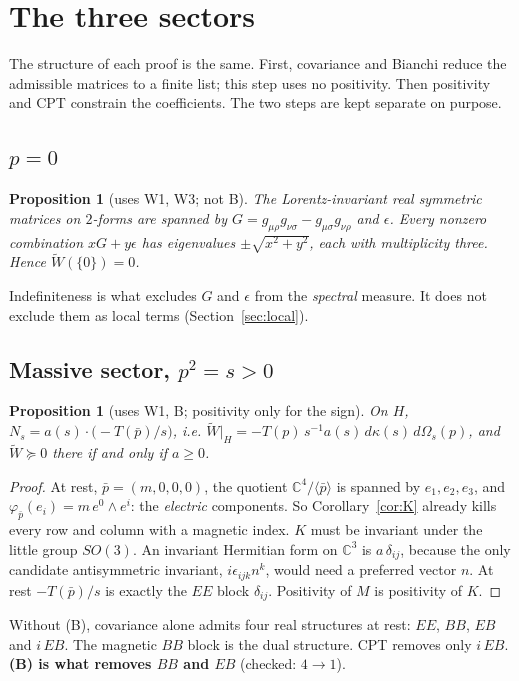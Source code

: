 \documentclass[11pt]{article}
\newtheorem{proposition}[theorem]{Proposition}
\theoremstyle{remark}
\newcommand{\Wt}{\widetilde W}
\newcommand{\Tt}{T}
\begin{document}
\section{The three sectors}

The structure of each proof is the same. First, covariance and Bianchi reduce
the admissible matrices to a finite list; this step uses no positivity. Then
positivity and CPT constrain the coefficients. The two steps are kept
separate on purpose.

\subsection{$p=0$}

\begin{proposition}[uses W1, W3; not B]\label{prop:zero}
The Lorentz-invariant real symmetric matrices on $2$-forms are spanned by
$G=g_{\mu\rho}g_{\nu\sigma}-g_{\mu\sigma}g_{\nu\rho}$ and $\epsilon$. Every
nonzero combination $xG+y\epsilon$ has eigenvalues $\pm\sqrt{x^2+y^2}$, each
with multiplicity three. Hence $\Wt(\{0\})=0$.
\end{proposition}
Indefiniteness is what excludes $G$ and $\epsilon$ from the \emph{spectral}
measure. It does not exclude them as local terms (Section~\ref{sec:local}).

\subsection{Massive sector, $p^2=s>0$}

\begin{proposition}[uses W1, B; positivity only for the sign]\label{prop:massive}
On $H$, $N_s=a(s)\cdot\bigl(-\Tt(\bar p)/s\bigr)$, i.e.
$\Wt|_H=-\Tt(p)\,s^{-1}a(s)\,d\kappa(s)\,d\Omega_s(p)$, and $\Wt\succeq0$ there
if and only if $a\ge0$.
\end{proposition}
\begin{proof}
At rest, $\bar p=(m,0,0,0)$, the quotient $\mathbb C^4/\langle\bar p\rangle$
is spanned by $e_1,e_2,e_3$, and $\varphi_{\bar p}(e_i)=m\,e^0\wedge e^i$: the
\emph{electric} components. So Corollary~\ref{cor:K} already kills every row
and column with a magnetic index. $K$ must be invariant under the little group
$SO(3)$. An invariant Hermitian form on $\mathbb C^3$ is $a\,\delta_{ij}$,
because the only candidate antisymmetric invariant, $i\epsilon_{ijk}n^k$, would
need a preferred vector $n$. At rest $-\Tt(\bar p)/s$ is exactly the $EE$ block
$\delta_{ij}$. Positivity of $M$ is positivity of $K$.
\end{proof}
Without (B), covariance alone admits four real structures at rest: $EE$, $BB$,
$EB$ and $i\,EB$. The magnetic $BB$ block is the dual structure. CPT removes
only $i\,EB$. \textbf{(B) is what removes $BB$ and $EB$} (checked: $4\to1$).
\end{document}
